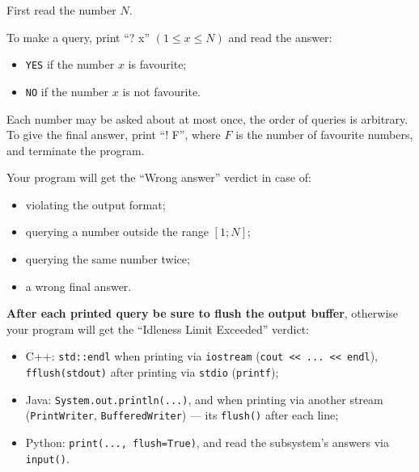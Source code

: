 First read the number $N$.

To make a query, print ``? x'' $(1 \le x \le N)$ and read the answer:

\begin{itemize}
\item \texttt{YES} if the number $x$ is favourite;
\item \texttt{NO} if the number $x$ is not favourite.
\end{itemize}

Each number may be asked about at most once, the order of queries is arbitrary. To give the final answer, print ``! F'', where $F$ is the number of favourite numbers, and terminate the program.

Your program will get the ``Wrong answer'' verdict in case of:

\begin{itemize}
\item violating the output format;
\item querying a number outside the range $[1; N]$;
\item querying the same number twice;
\item a wrong final answer.
\end{itemize}

\textbf{After each printed query be sure to flush the output buffer}, otherwise your program will get the ``Idleness Limit Exceeded'' verdict:

\begin{itemize}
\item C++: \texttt{std::endl} when printing via \texttt{iostream} (\texttt{cout << ... << endl}), \texttt{fflush(stdout)} after printing via \texttt{stdio} (\texttt{printf});
\item Java: \texttt{System.out.println(...)}, and when printing via another stream (\texttt{PrintWriter}, \texttt{BufferedWriter}) --- its \texttt{flush()} after each line;
\item Python: \texttt{print(..., flush=True)}, and read the subsystem's answers via \texttt{input()}.
\end{itemize}
